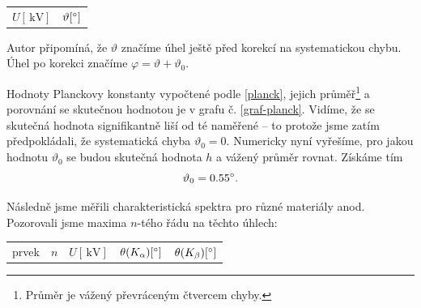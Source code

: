 \documentclass[10pt,a4paper]{article}
\renewcommand{\U}[1]{\ensuremath{\,\mathrm{#1}}}
\newcommand{\°}{\degree}
\begin{document}
\begin{minipage}{\linewidth}
    \vspace{\baselineskip}
    \centering
    \begin{tabular}{ r|rl }
        \bfseries $U [\U{kV}]$ &
        \multicolumn{2}{c}{$\vartheta [\°]$}
    \end{tabular}
    \vspace{\baselineskip}
    \label{mezni-uhly}
\end{minipage}

Autor připomíná, že $\vartheta$ značíme úhel ještě před korekcí na systematickou chybu. Úhel po korekci značíme ${\varphi = \vartheta + \vartheta_0}$.

Hodnoty Planckovy konstanty vypočtené podle \eqref{planck}, jejich průměř\footnote{Průměr je vážený převráceným čtvercem chyby.} a porovnání se skutečnou hodnotou je v grafu č. \ref{graf-planck}. Vidíme, že se skutečná hodnota signifikantně liší od té naměřené – to protože jsme zatím předpokládali, že systematická chyba $\vartheta_0 = 0$. Numericky nyní vyřešíme, pro jakou hodnotu $\vartheta_0$ se budou skutečná hodnota $h$ a vážený průměr rovnat. Získáme tím
\begin{equation}
    \vartheta_0 = 0.55 \°.
    \label{systematicka_chyba}
\end{equation}

Následně jsme měřili charakteristická spektra pro různé materiály anod. Pozorovali jsme maxima $n$-tého řádu na těchto úhlech:

\begin{minipage}{0.9\linewidth}
    \centering
    \vspace{\baselineskip}
    \begin{tabular}{ c|c|c|r|r }
        \multicolumn{1}{c|}{prvek} &
        \multicolumn{1}{c|}{$n$} &
        \multicolumn{1}{c|}{$U [\U{kV}]$} &
        \multicolumn{1}{c|}{$\theta(K_\alpha) [\°]$} &
        \multicolumn{1}{c}{$\theta(K_\beta) [\°]$}
    \end{tabular}
    \vspace{\baselineskip}
    \label{charakt-uhly}
\end{minipage}
\end{document}
